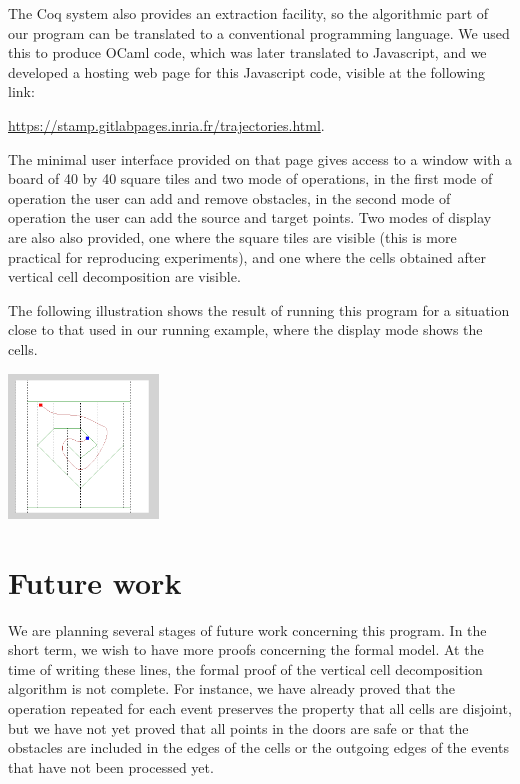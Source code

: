 \documentclass{easychair}
\begin{document}
The Coq system also provides an extraction facility, so the
algorithmic part of our program can be translated to a conventional
programming language.  We used this to produce OCaml code, which was
later translated to Javascript, and we developed a hosting web page for
this Javascript code, visible at the following link:
\begin{center}
\url{https://stamp.gitlabpages.inria.fr/trajectories.html}.
\end{center}

The minimal user interface provided on that page gives access to a 
window with a board of 40 by 40 square tiles and two mode of operations, in
the first mode of operation the user can add and remove obstacles, in the
second mode of operation the user can add the source and target points.  Two
modes of display are also also provided, one where the square tiles are
visible (this is more practical for reproducing experiments), and one where
the cells obtained after vertical cell decomposition are visible.

The following illustration shows the result of running this program for
a situation close to that used in our running example, where the display mode
shows the cells.
\begin{center}
\includegraphics[width=0.3\textwidth]{illustration.png}
\end{center}

\section{Future work}
We are planning several stages of future work concerning this program.  In
the short term, we wish to have more proofs concerning the formal model.
At the time of writing these lines, the formal proof of the vertical cell
decomposition algorithm is not complete.  For instance, we have already
proved that the operation repeated for each event preserves the property that
all cells are disjoint, but we have not yet proved that all points in
the doors are safe or that the obstacles are included in the edges of the
cells or the outgoing edges of the events that have not been processed
yet.
\end{document}
